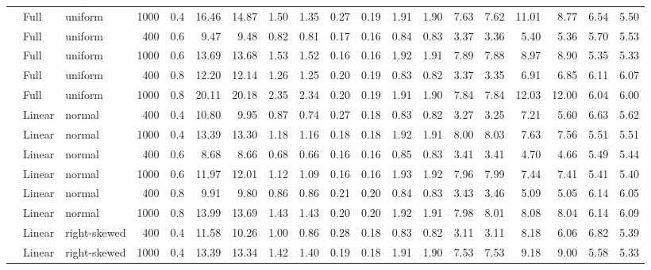 \documentclass[
  man]{apa7}
\begin{document}
\begin{landscape}
\begin{ThreePartTable}
\begin{longtable}[l]{lllrrrrrrrrrrrrrrrr}
\cmidrule{1-19}\pagebreak[0]
14 & Full & uniform & 1000 & 0.4 & 16.46 & 14.87 & 1.50 & 1.35 & 0.27 & 0.19 & 1.91 & 1.90 & 7.63 & 7.62 & 11.01 & 8.77 & 6.54 & 5.50\\
\cmidrule{1-19}\pagebreak[0]
15 & Full & uniform & 400 & 0.6 & 9.47 & 9.48 & 0.82 & 0.81 & 0.17 & 0.16 & 0.84 & 0.83 & 3.37 & 3.36 & 5.40 & 5.36 & 5.70 & 5.53\\
\cmidrule{1-19}\pagebreak[0]
16 & Full & uniform & 1000 & 0.6 & 13.69 & 13.68 & 1.53 & 1.52 & 0.16 & 0.16 & 1.92 & 1.91 & 7.89 & 7.88 & 8.97 & 8.90 & 5.35 & 5.33\\
\cmidrule{1-19}\pagebreak[0]
17 & Full & uniform & 400 & 0.8 & 12.20 & 12.14 & 1.26 & 1.25 & 0.20 & 0.19 & 0.83 & 0.82 & 3.37 & 3.35 & 6.91 & 6.85 & 6.11 & 6.07\\
\cmidrule{1-19}\pagebreak[0]
18 & Full & uniform & 1000 & 0.8 & 20.11 & 20.18 & 2.35 & 2.34 & 0.20 & 0.19 & 1.91 & 1.90 & 7.84 & 7.84 & 12.03 & 12.00 & 6.04 & 6.00\\
\cmidrule{1-19}\pagebreak[0]
19 & Linear & normal & 400 & 0.4 & 10.80 & 9.95 & 0.87 & 0.74 & 0.27 & 0.18 & 0.83 & 0.82 & 3.27 & 3.25 & 7.21 & 5.60 & 6.63 & 5.62\\
\cmidrule{1-19}\pagebreak[0]
20 & Linear & normal & 1000 & 0.4 & 13.39 & 13.30 & 1.18 & 1.16 & 0.18 & 0.18 & 1.92 & 1.91 & 8.00 & 8.03 & 7.63 & 7.56 & 5.51 & 5.51\\
\cmidrule{1-19}\pagebreak[0]
21 & Linear & normal & 400 & 0.6 & 8.68 & 8.66 & 0.68 & 0.66 & 0.16 & 0.16 & 0.85 & 0.83 & 3.41 & 3.41 & 4.70 & 4.66 & 5.49 & 5.44\\
\cmidrule{1-19}\pagebreak[0]
22 & Linear & normal & 1000 & 0.6 & 11.97 & 12.01 & 1.12 & 1.09 & 0.16 & 0.16 & 1.93 & 1.92 & 7.96 & 7.99 & 7.44 & 7.41 & 5.41 & 5.40\\
\cmidrule{1-19}\pagebreak[0]
23 & Linear & normal & 400 & 0.8 & 9.91 & 9.80 & 0.86 & 0.86 & 0.21 & 0.20 & 0.84 & 0.83 & 3.43 & 3.46 & 5.09 & 5.05 & 6.14 & 6.05\\
\cmidrule{1-19}\pagebreak[0]
24 & Linear & normal & 1000 & 0.8 & 13.99 & 13.69 & 1.43 & 1.43 & 0.20 & 0.20 & 1.92 & 1.91 & 7.98 & 8.01 & 8.08 & 8.04 & 6.14 & 6.09\\
\cmidrule{1-19}\pagebreak[0]
25 & Linear & right-skewed & 400 & 0.4 & 11.58 & 10.26 & 1.00 & 0.86 & 0.28 & 0.18 & 0.83 & 0.82 & 3.11 & 3.11 & 8.18 & 6.06 & 6.82 & 5.39\\
\cmidrule{1-19}\pagebreak[0]
26 & Linear & right-skewed & 1000 & 0.4 & 13.39 & 13.34 & 1.42 & 1.40 & 0.19 & 0.18 & 1.91 & 1.90 & 7.53 & 7.53 & 9.18 & 9.00 & 5.58 & 5.33\\

\end{longtable}
\end{ThreePartTable}
\end{landscape}
\end{document}
